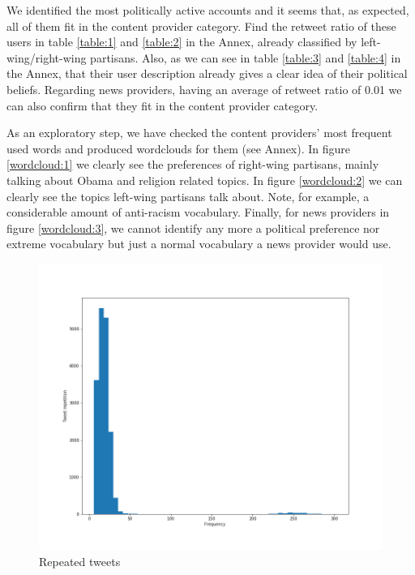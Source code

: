 \documentclass[12pt, authoryear]{elsarticle}
\begin{document}
We identified the most politically active accounts and it seems that, as expected, all of them fit in the content provider category. Find the retweet ratio of these users in table \ref{table:1} and \ref{table:2} in the Annex, already classified by left-wing/right-wing partisans. Also, as we can see in table \ref{table:3} and \ref{table:4} in the Annex, that their user description already gives a clear idea of their political beliefs. Regarding news providers, having an average of retweet ratio of 0.01 we can also confirm that they fit in the content provider category.

As an exploratory step, we have checked the content providers' most frequent used words and produced wordclouds for them (see Annex). In figure \ref{wordcloud:1} we clearly see the preferences of right-wing partisans, mainly talking about Obama and religion related topics. In figure \ref{wordcloud:2} we can clearly see the topics left-wing partisans talk about.  Note, for example, a considerable amount of anti-racism vocabulary. Finally, for news providers in figure \ref{wordcloud:3}, we cannot identify any more a political preference nor extreme vocabulary but just a normal vocabulary a news provider would use.

\begin{figure}[t]
\includegraphics[width=\textwidth]{tweet_rep}
\centering
\caption{Repeated tweets}
\label{retweets:2}
\end{figure}
\end{document}
